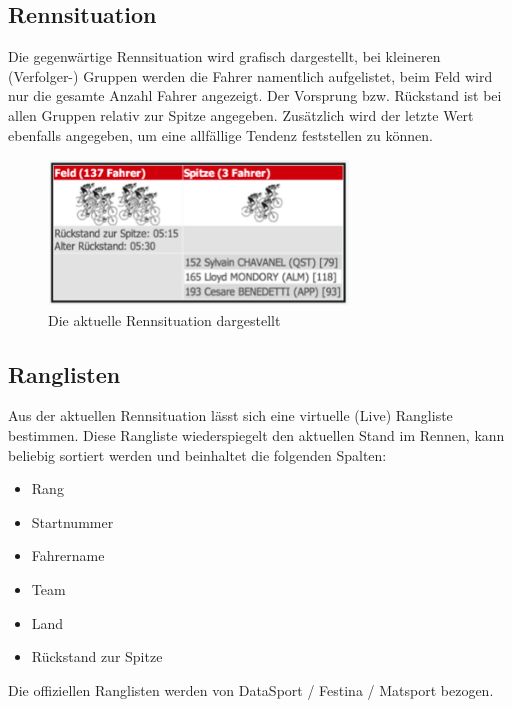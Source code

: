 \subsection{Rennsituation}
Die gegenwärtige Rennsituation wird grafisch dargestellt, bei kleineren (Verfolger-) Gruppen werden die Fahrer namentlich aufgelistet, beim Feld wird nur die gesamte Anzahl Fahrer angezeigt. Der Vorsprung bzw. Rückstand ist bei allen Gruppen relativ zur Spitze angegeben. Zusätzlich wird der letzte Wert ebenfalls angegeben, um eine allfällige Tendenz feststellen zu können.
\begin{figure}[H]
	\centering
	\includegraphics[width=80mm]{images/rennsituation.png}
	\caption{Die aktuelle Rennsituation dargestellt}
\end{figure}
\subsection{Ranglisten}
Aus der aktuellen Rennsituation lässt sich eine virtuelle (Live) Rangliste bestimmen. Diese Rangliste wiederspiegelt den aktuellen Stand im Rennen, kann beliebig sortiert werden und beinhaltet die folgenden Spalten:
\begin{itemize}
\item Rang
\item Startnummer
\item Fahrername
\item Team
\item Land
\item Rückstand zur Spitze
\end{itemize}
Die offiziellen Ranglisten werden von DataSport / Festina / Matsport bezogen.
